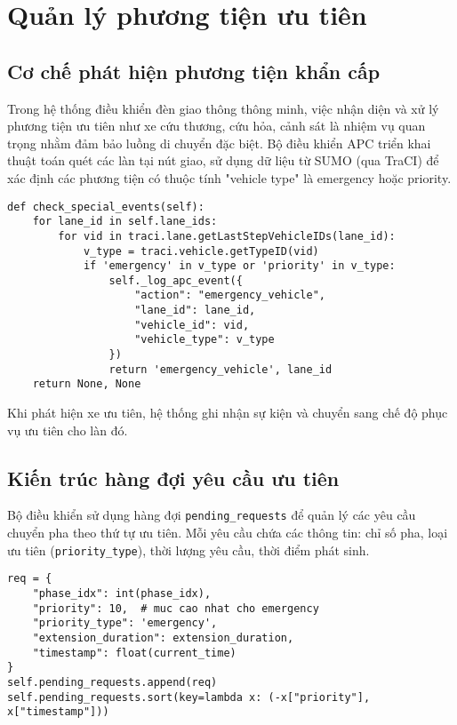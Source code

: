 \chapter{Quản lý phương tiện ưu tiên}

\section{Cơ chế phát hiện phương tiện khẩn cấp}

Trong hệ thống điều khiển đèn giao thông thông minh, việc nhận diện và xử lý phương tiện ưu tiên như xe cứu thương, cứu hỏa, cảnh sát là nhiệm vụ quan trọng nhằm đảm bảo luồng di chuyển đặc biệt. Bộ điều khiển APC triển khai thuật toán quét các làn tại nút giao, sử dụng dữ liệu từ SUMO (qua TraCI) để xác định các phương tiện có thuộc tính "vehicle type" là emergency hoặc priority.

\begin{lstlisting}[style=py,caption={Phát hiện phương tiện ưu tiên}]
def check_special_events(self):
    for lane_id in self.lane_ids:
        for vid in traci.lane.getLastStepVehicleIDs(lane_id):
            v_type = traci.vehicle.getTypeID(vid)
            if 'emergency' in v_type or 'priority' in v_type:
                self._log_apc_event({
                    "action": "emergency_vehicle",
                    "lane_id": lane_id,
                    "vehicle_id": vid,
                    "vehicle_type": v_type
                })
                return 'emergency_vehicle', lane_id
    return None, None
\end{lstlisting}

Khi phát hiện xe ưu tiên, hệ thống ghi nhận sự kiện và chuyển sang chế độ phục vụ ưu tiên cho làn đó.

\section{Kiến trúc hàng đợi yêu cầu ưu tiên}

Bộ điều khiển sử dụng hàng đợi \texttt{pending\_requests} để quản lý các yêu cầu chuyển pha theo thứ tự ưu tiên. Mỗi yêu cầu chứa các thông tin: chỉ số pha, loại ưu tiên (\texttt{priority\_type}), thời lượng yêu cầu, thời điểm phát sinh.

\begin{lstlisting}[style=py,caption={Cấu trúc yêu cầu chuyển pha ưu tiên}]
req = {
    "phase_idx": int(phase_idx),
    "priority": 10,  # muc cao nhat cho emergency
    "priority_type": 'emergency',
    "extension_duration": extension_duration,
    "timestamp": float(current_time)
}
self.pending_requests.append(req)
self.pending_requests.sort(key=lambda x: (-x["priority"], x["timestamp"]))
\end{lstlisting}

